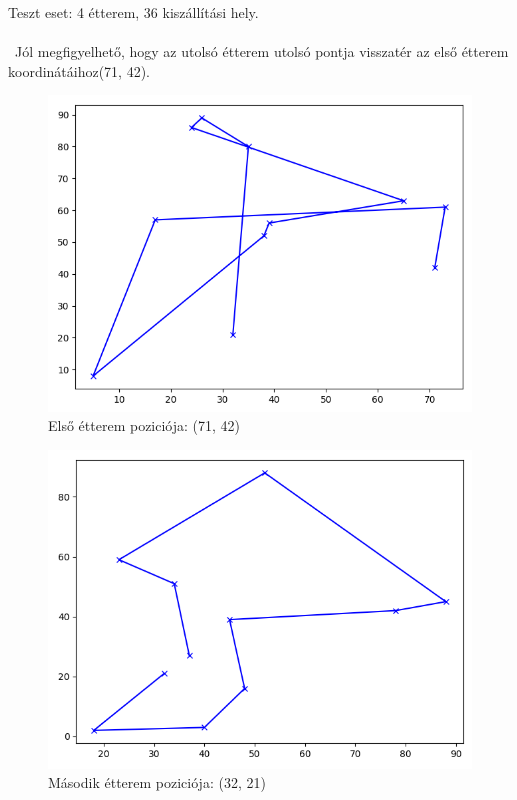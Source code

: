 
Teszt eset: 4 étterem, 36 kiszállítási hely. \\\
\\\
Jól megfigyelhető, hogy az utolsó étterem utolsó pontja visszatér az első étterem koordinátáihoz(71, 42).

\begin{figure}[h!]
\centering
\includegraphics[scale=0.8]{images/tsp1MR.png}
\caption{Első étterem poziciója: (71, 42)}
\label{fig:tspMR1}
\end{figure}

\begin{figure}[h!]
\centering
\includegraphics[scale=0.8]{images/tsp2MR.png}
\caption{Második étterem poziciója: (32, 21)}
\label{fig:tspMR2}
\end{figure}

